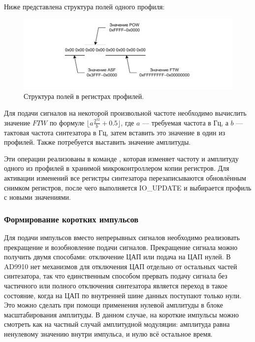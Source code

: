 \documentclass[rusmathsym, eqnumwithinsec, amspack, hyperref]{bomgost}
\begin{document}
Ниже представлена структура полей одного профиля:

%
%
\begin{gostfigure}
\begin{figure}[H]
\centering
\includegraphics{data/single_tone_profile_register_layout.drawio.pdf}
\caption{Структура полей в регистрах профилей.}
\label{fig:single_tone_profile_register_layout}
\end{figure}
\end{gostfigure}

Для подачи сигналов на некоторой произвольной частоте необходимо вычислить значение $FTW$ по формуле $\lfloor a\frac{2^{32}}{b} + 0.5 \rfloor$, где $a$ --- требуемая частота в Гц, а $b$ --- тактовая частота синтезатора в Гц, затем вставить это значение в один из профилей. Также потребуется выставить значение амплитуды.

Эти операции реализованы в команде {\footnotesize{}}, которая изменяет частоту и амплитуду одного из профилей в хранимой микроконтроллером копии регистров. Для активации изменений все регистры синтезатора перезаписываются обновлённым снимком регистров, после чего выполняется IO\_UPDATE и выбирается профиль с новыми значениями.

\subsubsection{Формирование коротких импульсов}

Для подачи импульсов вместо непрерывных сигналов необходимо реализовать прекращение и возобновление подачи сигналов. Прекращение сигнала можно получить двумя способами: отключение ЦАП или подача на ЦАП нулей. В AD9910 нет механизмов для отключения ЦАП отдельно от остальных частей синтезатора, так что единственным способом прервать подачу сигнала без частичного или полного отключения синтезатора является переход в такое состояние, когда на ЦАП по внутренней шине данных поступают только нули. Это  можно сделать при помощи применения нулевой амплитуды в блоке масштабирования амплитуды. В данном случае, на короткие импульсы можно смотреть как на частный случай амплитудной модуляции: амплитуда равна ненулевому значению внутри импульса, и нулю всё остальное время.
\end{document}
